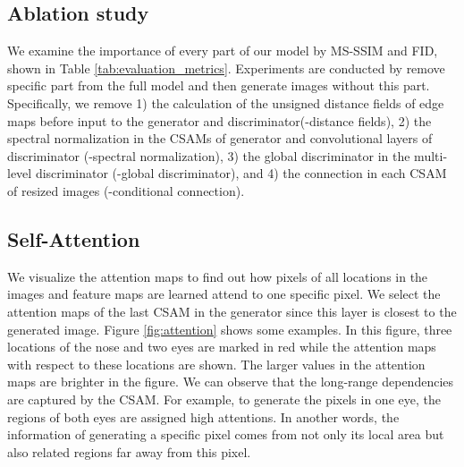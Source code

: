 \subsection{Ablation study}
We examine the importance of every part of our model by MS-SSIM and FID, shown in Table \ref{tab:evaluation_metrics}. Experiments are conducted by remove specific part from the full model and then generate images without this part. Specifically, we remove 1) the calculation of the unsigned distance fields of edge maps before input to the generator and discriminator(-distance fields), 2) the spectral normalization in the CSAMs of generator and convolutional layers of discriminator (-spectral normalization), 3) the global discriminator in the multi-level discriminator (-global discriminator), and 4) the connection in each CSAM of resized images (-conditional connection). 
%
\subsection{Self-Attention}
We visualize the attention maps to find out how pixels of all locations in the images and feature maps are learned attend to one specific pixel. We select the attention maps of the last CSAM in the generator since this layer is closest to the generated image.  Figure \ref{fig:attention} shows some examples. In this figure, three locations of the nose and two eyes are marked in red while the attention maps with respect to these locations are shown. The larger values in the attention maps are brighter in the figure. We can observe that the long-range dependencies are captured by the CSAM. For example, to generate the pixels in one eye, the regions of both eyes are assigned high attentions. In another words, the information of generating a specific pixel comes from not only its local area but also related regions far away from this pixel. 
%

%